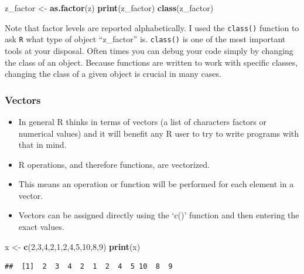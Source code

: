 \documentclass[]{book}
\newenvironment{Shaded}{\begin{snugshade}}{\end{snugshade}}
\newcommand{\DecValTok}[1]{\textcolor[rgb]{0.00,0.00,0.81}{#1}}
\newcommand{\KeywordTok}[1]{\textcolor[rgb]{0.13,0.29,0.53}{\textbf{#1}}}
\newcommand{\NormalTok}[1]{#1}
\newcommand{\StringTok}[1]{\textcolor[rgb]{0.31,0.60,0.02}{#1}}
\begin{document}
\begin{Shaded}
\begin{Highlighting}[]
\NormalTok{z_factor <-}\StringTok{ }\KeywordTok{as.factor}\NormalTok{(z)}
\KeywordTok{print}\NormalTok{(z_factor)}
\KeywordTok{class}\NormalTok{(z_factor)}
\end{Highlighting}
\end{Shaded}

Note that factor levels are reported alphabetically. I used the \texttt{class()} function to ask \texttt{R} what type of object ``z\_factor'' is. \texttt{class()} is one of the most important tools at your disposal. Often times you can debug your code simply by changing the class of an object. Because functions are written to work with specific classes, changing the class of a given object is crucial in many cases.

\hypertarget{vectors}{%
\subsubsection{Vectors}\label{vectors}}

\begin{itemize}
\item
  In general R thinks in terms of vectors (a list of characters factors or numerical values) and it will benefit any R user to try to write programs with that in mind.
\item
  R operations, and therefore functions, are vectorized.
\item
  This means an operation or function will be performed for each element in a vector.
\item
  Vectors can be assigned directly using the `c()' function and then entering the exact values.
\end{itemize}

\begin{Shaded}
\begin{Highlighting}[]
\NormalTok{x <-}\StringTok{ }\KeywordTok{c}\NormalTok{(}\DecValTok{2}\NormalTok{,}\DecValTok{3}\NormalTok{,}\DecValTok{4}\NormalTok{,}\DecValTok{2}\NormalTok{,}\DecValTok{1}\NormalTok{,}\DecValTok{2}\NormalTok{,}\DecValTok{4}\NormalTok{,}\DecValTok{5}\NormalTok{,}\DecValTok{10}\NormalTok{,}\DecValTok{8}\NormalTok{,}\DecValTok{9}\NormalTok{)}
\KeywordTok{print}\NormalTok{(x)}
\end{Highlighting}
\end{Shaded}

\begin{verbatim}
##  [1]  2  3  4  2  1  2  4  5 10  8  9
\end{verbatim}
\end{document}
